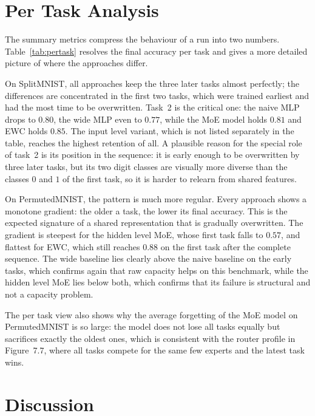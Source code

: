 \section{Per Task Analysis}
\label{sec:pertask}

The summary metrics compress the behaviour of a run into two numbers.
Table~\ref{tab:pertask} resolves the final accuracy per task and gives a more detailed
picture of where the approaches differ.



On SplitMNIST, all approaches keep the three later tasks almost perfectly;
the differences are concentrated in the first two tasks, which were trained
earliest and had the most time to be overwritten. Task~2 is the critical
one: the naive MLP drops to $0.80$, the wide MLP even to $0.77$, while the
MoE model holds $0.81$ and EWC holds $0.85$. The input level variant, which
is not listed separately in the table, reaches the highest retention of
all. A plausible reason for the special role of task~2 is its position in
the sequence: it is early enough to be overwritten by three later tasks,
but its two digit classes are visually more diverse than the classes $0$
and $1$ of the first task, so it is harder to relearn from shared
features.

On PermutedMNIST, the pattern is much more regular. Every approach shows a
monotone gradient: the older a task, the lower its final accuracy. This is
the expected signature of a shared representation that is gradually
overwritten. The gradient is steepest for the hidden level MoE, whose
first task falls to $0.57$, and flattest for EWC, which still reaches
$0.88$ on the first task after the complete sequence. The wide baseline
lies clearly above the naive baseline on the early tasks, which confirms
again that raw capacity helps on this benchmark, while the hidden level MoE
lies below both, which confirms that its failure is structural and not a
capacity problem.

The per task view also shows why the average forgetting of the MoE model
on PermutedMNIST is so large: the model does not lose all tasks equally
but sacrifices exactly the oldest ones, which is consistent with the router
profile in Figure~7.7, where all tasks compete for the same few experts
and the latest task wins.

\section{Discussion}
\label{sec:discussion}

